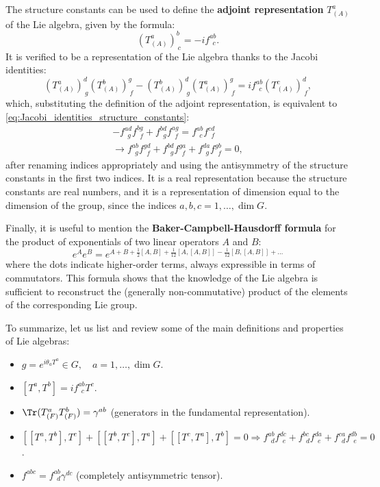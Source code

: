 The structure constants can be used to define the \textbf{adjoint representation} $T_{(A)}^a$ of the Lie algebra, given by the formula:
\begin{equation}
    (T_{(A)}^a)^b_{\ c} = -i f^{ab}_{\ \ c}.
    \label{eq:adjoint_representation_general_definition}
\end{equation}
It is verified to be a representation of the Lie algebra thanks to the Jacobi identities:
\[
    (T_{(A)}^a)^d_{\ g} (T_{(A)}^b)^g_{\ f} - (T_{(A)}^b)^d_{\ g} (T_{(A)}^a)^g_{\ f} = i f^{ab}_{\ \ c} (T_{(A)}^c)^d_{\ f},
\]
which, substituting the definition of the adjoint representation, is equivalent to \eqref{eq:Jacobi_identities_structure_constants}:
\[
    \begin{aligned}
        - f^{ad}_{\ \ g} f^{bg}_{\ \ f} + f^{bd}_{\ \ g} f^{ag}_{\ \ f} = f^{ab}_{\ \ c} f^{cd}_{\ \ f} \\
        \rightarrow f^{ab}_{\ \ g} f^{gd}_{\ \ f} + f^{bd}_{\ \ g} f^{ga}_{\ \ f} + f^{da}_{\ \ g} f^{gb}_{\ \ f} = 0,
    \end{aligned}
\]
after renaming indices appropriately and using the antisymmetry of the structure constants in the first two indices. It is a real representation because the structure constants are real numbers, and it is a representation of dimension equal to the dimension of the group, since the indices $a, b, c = 1, \dots, \dim G$.

Finally, it is useful to mention the \textbf{Baker-Campbell-Hausdorff formula} for the product of exponentials of two linear operators $A$ and $B$:
\begin{equation}
    e^A e^B = e^{A + B + \frac{1}{2}[A, B] + \frac{1}{12}[A, [A, B]] - \frac{1}{12}[B, [A, B]] + \dots}
    \label{eq:Baker-Campbell-Hausdorff_formula}
\end{equation}
where the dots indicate higher-order terms, always expressible in terms of commutators. This formula shows that the knowledge of the Lie algebra is sufficient to reconstruct the (generally non-commutative) product of the elements of the corresponding Lie group.

To summarize, let us list and review some of the main definitions and properties of Lie algebras:
\begin{itemize}
    \item[(i)] $g = e^{i \theta_a T^a} \in G, \quad a = 1, \dots, \dim G$.
    \item[(ii)] $[T^a, T^b] = i f^{ab}_{\ \ c} T^c$.
    \item[(iii)] $\Tr(T_{(F)}^a T_{(F)}^b) = \gamma^{ab}$ \quad (generators in the fundamental representation).
    \item[(iv)] $[[T^a, T^b], T^c] + [[T^b, T^c], T^a] + [[T^c, T^a], T^b] = 0 \Rightarrow f^{ab}_{\ \ d} f^{dc}_{\ \ e} + f^{bc}_{\ \ d} f^{da}_{\ \ e} + f^{ca}_{\ \ d} f^{db}_{\ \ e} = 0$.
    \item[(v)] $f^{abc} = f^{ab}_{\ \ d} \gamma^{dc}$ \quad (completely antisymmetric tensor).
\end{itemize}

